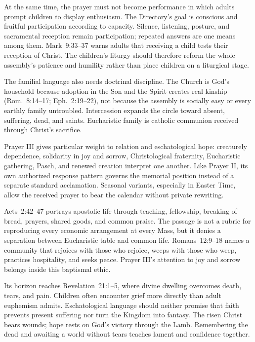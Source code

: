 At the same time, the prayer must not become performance in which adults prompt children to display enthusiasm. The Directory's goal is conscious and fruitful participation according to capacity. Silence, listening, posture, and sacramental reception remain participation; repeated answers are one means among them. Mark~9:33--37 warns adults that receiving a child tests their reception of Christ. The children's liturgy should therefore reform the whole assembly's patience and humility rather than place children on a liturgical stage.

The familial language also needs doctrinal discipline. The Church is God's household because adoption in the Son and the Spirit creates real kinship (Rom.~8:14--17; Eph.~2:19--22), not because the assembly is socially easy or every earthly family untroubled. Intercession expands the circle toward absent, suffering, dead, and saints. Eucharistic family is catholic communion received through Christ's sacrifice.


Prayer III gives particular weight to relation and eschatological hope: creaturely dependence, solidarity in joy and sorrow, Christological fraternity, Eucharistic gathering, Pasch, and renewed creation interpret one another. Like Prayer II, its own authorized response pattern governs the memorial position instead of a separate standard acclamation. Seasonal variants, especially in Easter Time, allow the received prayer to bear the calendar without private rewriting.

Acts~2:42--47 portrays apostolic life through teaching, fellowship, breaking of bread, prayers, shared goods, and common praise. The passage is not a rubric for reproducing every economic arrangement at every Mass, but it denies a separation between Eucharistic table and common life. Romans~12:9--18 names a community that rejoices with those who rejoice, weeps with those who weep, practices hospitality, and seeks peace. Prayer III's attention to joy and sorrow belongs inside this baptismal ethic.

Its horizon reaches Revelation~21:1--5, where divine dwelling overcomes death, tears, and pain. Children often encounter grief more directly than adult euphemism admits. Eschatological language should neither promise that faith prevents present suffering nor turn the Kingdom into fantasy. The risen Christ bears wounds; hope rests on God's victory through the Lamb. Remembering the dead and awaiting a world without tears teaches lament and confidence together.

